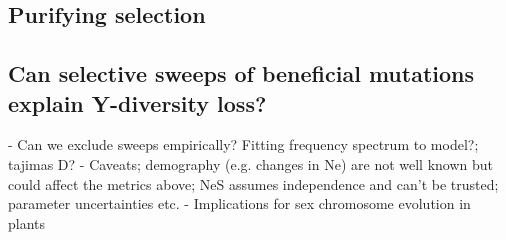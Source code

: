 \documentclass[9pt,twocolumn,twoside]{gsajnl}
\begin{document}
\subsection*{Purifying selection}






\subsection*{Can selective sweeps of beneficial mutations explain Y-diversity loss?}
- Can we exclude sweeps empirically? Fitting frequency spectrum to model?; tajimas D?
- Caveats; demography (e.g. changes in Ne) are not well known but could affect the metrics above; NeS assumes independence and can't be trusted; parameter uncertainties etc.
- Implications for sex chromosome evolution in plants
\end{document}
